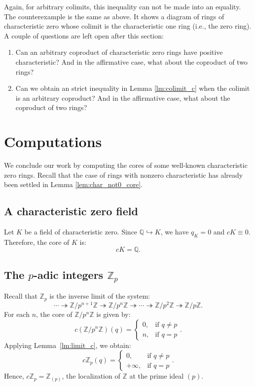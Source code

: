 \documentclass{amsart}
\newcommand{\Z}{{\mathbb Z}}
\newcommand{\Q}{{\mathbb Q}}
\begin{document}
    Again, for arbitrary colimits, this inequality can not be made into an equality.
    The counterexample is the same as above.
    It shows a diagram of rings of characteristic zero whose colimit is the characteristic one ring (i.e., the zero ring).\\
    
    A couple of questions are left open after this section:
    \begin{enumerate}
        \item Can an arbitrary coproduct of characteristic zero rings have positive characteristic? And in the affirmative case, what about the coproduct of two rings?
        \item Can we obtain an strict inequality in Lemma \ref{lm:colimit_c} when the colimit is an arbitrary coproduct? And in the affirmative case, what about the coproduct of two rings?
    \end{enumerate}
    


    \section{Computations}
    \label{sec:compu}
    We conclude our work by computing the cores of some well-known characteristic zero rings.
    Recall that the case of rings with nonzero characteristic has already been settled in Lemma \ref{lem:char_not0_core}.

    \subsection{A characteristic zero field}
    Let $K$ be a field of characteristic zero.  
    Since $\Q \hookrightarrow K$, we have $q_K = 0$ and $cK \equiv 0$.  
    Therefore, the core of $K$ is:
    $$
    cK = \Q.
    $$

    \subsection{The $p$-adic integers $\Z_p$}
    
    Recall that $\Z_p$ is the inverse limit of the system:
    $$
    \cdots \twoheadrightarrow \Z/p^{n+1}\Z \twoheadrightarrow \Z/p^n\Z \twoheadrightarrow
    \cdots \twoheadrightarrow \Z/p^2\Z \twoheadrightarrow \Z/p\Z.
    $$
    For each $n$, the core of $\Z/p^n\Z$ is given by:
    $$
    c(\Z/p^n\Z)(q) =
    \begin{cases}
    0, & \text{if $q \not= p$}\\
    n, & \text{if $q = p$}
    \end{cases}.
    $$
    Applying Lemma~\ref{lm:limit_c}, we obtain:
    $$
    c\Z_p(q) =
    \begin{cases}
    0, & \text{if $q \not= p$}\\
    +\infty, & \text{if $q = p$}
    \end{cases}.
    $$
    Hence, $c\Z_p = \Z_{(p)}$, the localization of $\Z$ at the prime ideal $(p)$.
    
\end{document}
